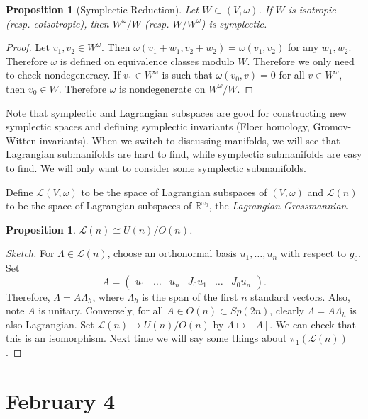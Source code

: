 \documentclass[leqno, openany]{memoir}
\newtheorem{prop}[thm]{Proposition}
\theoremstyle{definition}
\theoremstyle{remark}
\theoremstyle{plain}
\theoremstyle{definition}
\theoremstyle{remark}
\newcommand{\R}{\mathbb{R}}
\newcommand{\mc}[1]{\mathcal{#1}}
\begin{document}
\begin{prop}[Symplectic Reduction]
    Let $W \subset (V, \omega)$. If $W$ is isotropic (resp. coisotropic), then $W^{\omega}/W$ (resp. $W/W^{\omega}$) is symplectic.
\end{prop}

\begin{proof}
    Let $v_1, v_2 \in W^{\omega}$. Then $\omega(v_1 + w_1, v_2 + w_2) = \omega(v_1, v_2)$ for any $w_1, w_2$. Therefore $\omega$ is defined on equivalence classes modulo $W$. Therefore we only need to check nondegeneracy. If $v_1 \in W^{\omega}$ is such that $\omega(v_0, v) = 0$ for all $v \in W^{\omega}$, then $v_0 \in W$. Therefore $\omega$ is nondegenerate on $W^{\omega}/W$.
\end{proof}

Note that symplectic and Lagrangian subspaces are good for constructing new symplectic spaces and defining symplectic invariants (Floer homology, Gromov-Witten invariants). When we switch to discussing manifolds, we will see that Lagrangian submanifolds are hard to find, while symplectic submanifolds are easy to find. We will only want to consider some symplectic submanifolds.

Define $\mc{L}(V, \omega)$ to be the space of Lagrangian subspaces of $(V, \omega)$ and $\mc{L}(n)$ to be the space of Lagrangian subspaces of $\R^{\omega_0}$, the \textit{Lagrangian Grassmannian}. 

\begin{prop}
    $\mc{L}(n) \cong U(n)/O(n)$.
\end{prop}

\begin{proof}[Sketch]
    For $\Lambda \in \mc{L}(n)$, choose an orthonormal basis $u_1, \ldots, u_n$ with respect to $g_0$. Set 
    \[ A = \begin{pmatrix}
        u_1 & \ldots & u_n & J_0 u_1 & \ldots & J_0 u_n
    \end{pmatrix}.\] 
    Therefore, $\Lambda = A \Lambda_h$, where $\Lambda_h$ is the span of the first $n$ standard vectors. Also, note $A$ is unitary. Conversely, for all $A \in O(n) \subset Sp(2n)$, clearly $\Lambda = A\Lambda_h$ is also Lagrangian. Set $\mc{L}(n) \to U(n)/O(n)$ by $\Lambda \mapsto [A]$. We can check that this is an isomorphism. Next time we will say some things about $\pi_1(\mc{L}(n))$.
\end{proof}

\chapter{February 4}%
\label{cha:february_4}
\end{document}
